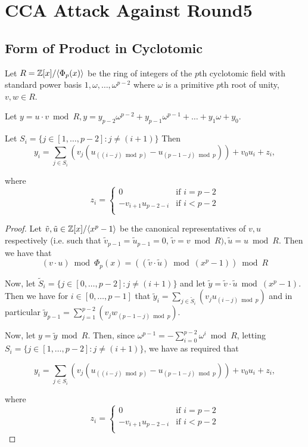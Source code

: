 \section{CCA Attack Against Round5}
\label{sec:cca-attack-against}

\subsection{Form of Product in Cyclotomic}
\label{sec:form-prod-cycl}

\begin{lemma}
\label{lem:mult-form}
Let $R=\mathbb{Z}[x]/\langle\Phi_{p}(x)\rangle$ be the ring of integers of the $p$th cyclotomic field with standard power basis $1,\omega,\ldots,\omega^{p-2}$ where $\omega$ is a primitive $p$th root of unity, $v, w \in R$.

Let $y=u \cdot v \bmod{R}, y=y_{p-2}\omega^{p-2}+y_{p-1}\omega^{p-1}+\ldots+y_{1}\omega+y_{0}$. 

Let $S_{i}=\{j \in [1,\ldots,p-2]: j \neq (i+1)\}$
Then 
\[y_{i}=\sum_{j \in S_{i}}\left(v_{j}\left(u_{((i-j)\bmod{p})}-u_{(p-1-j)\bmod{p}}\right)\right)+v_0u_{i}+z_{i},\]

where 
\[z_i=\begin{cases}0&\text{if }i=p-2\\
-v_{i+1}u_{p-2-i}&\text{if }i<p-2\\\end{cases}\]
\end{lemma}

\begin{proof}


Let 
$\tilde{v}, \tilde{u} \in \mathbb{Z}[x]/\langle x^p-1\rangle$ be the canonical
representatives of $v, u$ respectively
(i.e. such that $\tilde{v}_{p-1}=\tilde{u}_{p-1}=0$, $\tilde{v}=v
\bmod R), \tilde{u}=u \bmod R$. Then we have that 
\[(v\cdot u) \bmod \Phi_{p}(x)=\left((\tilde{v}\cdot \tilde{u}) \bmod
    (x^{p}-1)\right) \bmod R \]

Now, let $\tilde{S}_i=\{j \in [0,\ldots,p-2]: j \neq (i+1)\}$ and let
$\tilde{y}=\tilde{v} \cdot \tilde{u} \bmod (x^p-1)$. Then we
have for $i \in [0,\ldots,p-1]$ that $\tilde{y}_i=\sum_{j \in \tilde{S}_i} (v_{j}u_{(i-j) \bmod p})$
and in particular $\tilde{y}_{p-1}=\sum_{j=1}^{p-2}(v_{j}w_{(p-1-j) \bmod p})$.

Now, let $y=\tilde{y} \bmod R$. Then, since
$\omega^{p-1}=-\sum_{i=0}^{p-2}\omega^{i} \bmod R$, letting 
$S_{i}=\{j \in [1,\ldots,p-2]: j \neq (i+1)\}$, we have as required that 

\[y_{i}=\sum_{j \in S_{i}}\left(v_{j}\left(u_{((i-j)\bmod{p})}-u_{(p-1-j)\bmod{p}}\right)\right)+v_0u_{i}+z_{i},\]

where 
\[z_i=\begin{cases}0&\text{if }i=p-2\\
-v_{i+1}u_{p-2-i}&\text{if }i<p-2\\\end{cases}\]
\end{proof}


